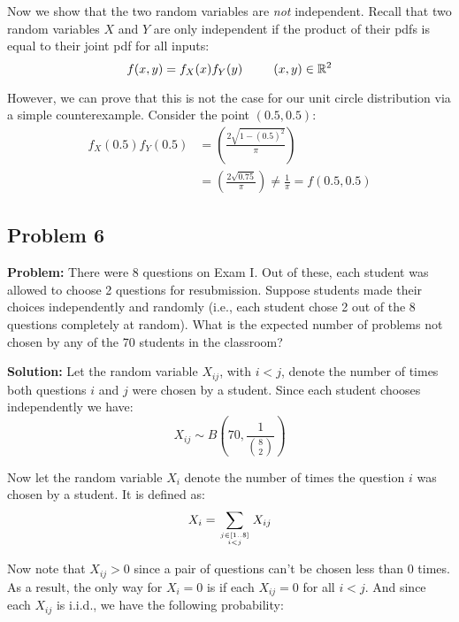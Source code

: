 \documentclass{article}
\begin{document}
Now we show that the two random variables are \textit{not} independent. Recall that two random variables $X$ and $Y$ are only independent if the product of their pdfs is equal to their joint pdf for all inputs:
\begin{equation*}
    f(x,y)=f_X(x)f_Y(y)\,\,\,\,\,\,\,\,\,\,\,\,\,\,\,(x,y)\in\mathbb R^2\\
\end{equation*}

However, we can prove that this is not the case for our unit circle distribution via a simple counterexample. Consider the point $(0.5,0.5)$:
\begin{align*}
    f_X(0.5)f_Y(0.5)&=\left(\frac{2\sqrt{1-(0.5)^2}}{\pi}\right)\\
    &=\left(\frac{2\sqrt{0.75}}{\pi}\right)\not=\frac{1}{\pi}=f(0.5,0.5)
\end{align*}


\subsection*{Problem 6}
\noindent\textbf{Problem:} There were 8 questions on Exam I. Out of these, each student was allowed to choose 2 questions for resubmission. Suppose students made their choices independently and randomly (i.e., each student chose 2 out of the 8 questions completely at random). What is the expected number of problems not chosen by any of the 70 students in the classroom?
\bigskip

\noindent\textbf{Solution:} Let the random variable $X_{ij}$, with $i<j$, denote the number of times both questions $i$ and $j$ were chosen by a student. Since each student chooses independently we have:
\begin{equation*}
    X_{ij}\sim B\left(70,\frac{1}{\binom{8}{2}}\right)
\end{equation*}

Now let the random variable $X_i$ denote the number of times the question $i$ was chosen by a student. It is defined as:
\begin{equation*}
    X_i=\sum_{j\in[1..8]\atop{i<j}}X_{ij}
\end{equation*}

Now note that $X_{ij}>0$ since a pair of questions can't be chosen less than 0 times. As a result, the only way for $X_i=0$ is if each $X_{ij}=0$ for all $i<j$. And since each $X_{ij}$ is i.i.d., we have the following probability:
\end{document}
